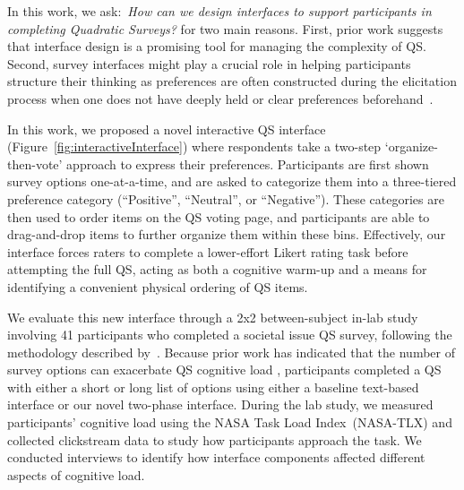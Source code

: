 
In this work, we ask:~\textit{How can we design interfaces to support participants in completing Quadratic Surveys?} for two main reasons. First, prior work suggests that interface design is a promising tool for managing the complexity of QS\cite{engstrom2020politics, weijtersEffectRatingScale2010, kierujVariationsResponseStyle2010, toepoelSmileysStarsHearts2019, farzandAestheticsEvaluatingResponse2024, xiaoTellMeYourself2020, pielotDidYouMisclick2024}. Second, survey interfaces might play a crucial role in helping participants structure their thinking as preferences are often constructed during the elicitation process when one does not have deeply held or clear preferences beforehand~\cite{lichtensteinConstructionPreference2006}.

In this work, we proposed a novel interactive QS interface (Figure~\ref{fig:interactiveInterface}) where respondents take a two-step `organize-then-vote' approach to express their preferences. Participants are first shown survey options one-at-a-time, and are asked to categorize them into a three-tiered preference category (``Positive'', ``Neutral'', or ``Negative''). These categories are then used to order items on the QS voting page, and participants are able to drag-and-drop items to further organize them within these bins. Effectively, our interface forces raters to complete a lower-effort Likert rating task before attempting the full QS, acting as both a cognitive warm-up and a means for identifying a convenient physical ordering of QS items.

We evaluate this new interface through a 2x2 between-subject in-lab study involving 41 participants who completed a societal issue QS survey, following the methodology described by~\textcite{chengCanShowWhat2021}. Because prior work has indicated that the number of survey options can exacerbate QS cognitive load \cite{lenznerCognitiveBurdenSurvey2010, blessAskingDifficultQuestions1992}, participants completed a QS with either a short or long list of options using either a baseline text-based interface or our novel two-phase interface. During the lab study, we measured participants' cognitive load using the NASA Task Load Index~(NASA-TLX) and collected clickstream data to study how participants approach the task. We conducted interviews to identify how interface components affected different aspects of cognitive load.

